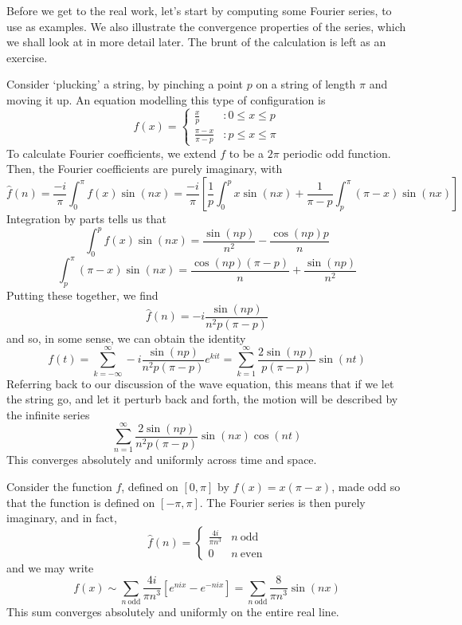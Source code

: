 Before we get to the real work, let's start by computing some Fourier series, to use as examples. We also illustrate the convergence properties of the series, which we shall look at in more detail later. The brunt of the calculation is left as an exercise.

\begin{example}
    Consider `plucking' a string, by pinching a point $p$ on a string of length $\pi$ and moving it up. An equation modelling this type of configuration is
    \[ f(x) = \begin{cases} \frac{x}{p} & : 0 \leq x \leq p \\ \frac{\pi - x}{\pi - p} & : p \leq x \leq \pi \end{cases} \]
    To calculate Fourier coefficients, we extend $f$ to be a $2 \pi$ periodic odd function. Then, the Fourier coefficients are purely imaginary, with
    \[ \hat{f}(n) = \frac{-i}{\pi} \int_0^\pi f(x) \sin(nx) = \frac{-i}{\pi} \left[ \frac{1}{p} \int_0^p x \sin(nx) + \frac{1}{\pi - p} \int_p^\pi (\pi - x) \sin(nx) \right] \]
    Integration by parts tells us that
    \[ \int_0^p f(x) \sin(nx) = \frac{\sin(np)}{n^2} - \frac{\cos(np) p}{n} \]
    \[ \int_p^\pi (\pi - x) \sin(nx) = \frac{\cos(np) (\pi - p)}{n} + \frac{\sin(np)}{n^2} \]
    Putting these together, we find
    \[ \widehat{f}(n) = - i \frac{\sin(np)}{n^2 p (\pi - p)} \]
    and so, in some sense, we can obtain the identity
    \[ f(t) = \sum_{k = -\infty}^\infty -i \frac{\sin(np)}{n^2 p (\pi - p)} e^{k i t} = \sum_{k = 1}^\infty \frac{2 \sin(np)}{p (\pi - p)} \sin(nt) \]
    Referring back to our discussion of the wave equation, this means that if we let the string go, and let it perturb back and forth, the motion will be described by the infinite series
    \[ \sum_{n = 1}^\infty \frac{2 \sin(np)}{n^2 p (\pi - p)} \sin(nx) \cos(nt) \]
    This converges absolutely and uniformly across time and space.
\end{example}

\begin{example}
    Consider the function $f$, defined on $[0,\pi]$ by $f(x) = x(\pi - x)$, made odd so that the function is defined on $[-\pi,\pi]$. The Fourier series is then purely imaginary, and in fact,
    \[ \hat{f}(n) = \begin{cases} \frac{4i}{\pi n^3} & n\ \text{odd} \\ 0 & n\ \text{even} \end{cases} \]
    and we may write
    \[ f(x) \sim \sum_{n\ \text{odd}} \frac{4i}{\pi n^3} [e^{nix} - e^{-nix}] = \sum_{n\ \text{odd}} \frac{8}{\pi n^3} \sin(nx) \]
    This sum converges absolutely and uniformly on the entire real line.
\end{example}

